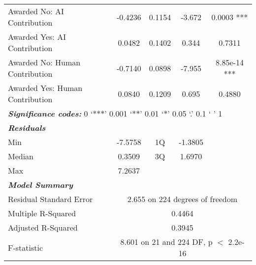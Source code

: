\begin{table}[ht]
\begin{tabular}{lcccc}
        Awarded No: AI Contribution & -0.4236  & 0.1154  & -3.672  & 0.0003 ***  \\
        Awarded Yes: AI Contribution & 0.0482  & 0.1402  & 0.344  & 0.7311  \\
        Awarded No: Human Contribution & -0.7140  & 0.0898  & -7.955  & 8.85e-14 ***  \\
        Awarded Yes: Human Contribution & 0.0840  & 0.1209  & 0.695  & 0.4880  \\
        \midrule
        \multicolumn{5}{l}{\textbf{\textit{Significance codes:}} 0 ‘***’ 0.001 ‘**’ 0.01 ‘*’ 0.05 ‘.’ 0.1 ‘ ’ 1} \\
        \midrule
        \textbf{\textit{Residuals}} & \multicolumn{4}{c}{} \\
        Min & -7.5758 & 1Q & -1.3805 &  \\
        Median & 0.3509 & 3Q & 1.6970 &  \\
        Max & 7.2637 &  &  &  \\
        \midrule
        \textbf{\textit{Model Summary}}\\
        Residual Standard Error & \multicolumn{4}{c}{2.655 on 224 degrees of freedom} \\
        Multiple R-Squared & \multicolumn{4}{c}{0.4464} \\
        Adjusted R-Squared & \multicolumn{4}{c}{0.3945} \\
        F-statistic & \multicolumn{4}{c}{8.601 on 21 and 224 DF, p $<$ 2.2e-16} \\
        \bottomrule
    \end{tabular}
    \label{tab:regression_trust_female}
\end{table}


